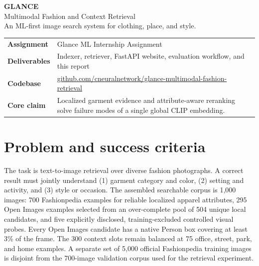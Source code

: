 \documentclass[11pt]{article}
\begin{document}
\thispagestyle{empty}
\colorbox{ink}{\parbox{0.96\linewidth}{\vspace{0.45in}\color{paper}\Huge\textbf{GLANCE}\\[0.12in]\LARGE Multimodal Fashion and Context Retrieval\\[0.18in]\normalsize An ML-first image search system for clothing, place, and style.\vspace{0.45in}}}

\vspace{0.42in}
\begin{tabularx}{\linewidth}{@{}>{\bfseries}l X@{}}
Assignment & Glance ML Internship Assignment \\
Deliverables & Indexer, retriever, FastAPI website, evaluation workflow, and this report \\
Codebase & \href{https://github.com/cneuralnetwork/glance-multimodal-fashion-retrieval}{github.com/cneuralnetwork/glance-multimodal-fashion-retrieval} \\
Core claim & Localized garment evidence and attribute-aware reranking solve failure modes of a single global CLIP embedding. \\
\end{tabularx}

\vfill
{}
\vspace{0.2in}
\newpage

\section{Problem and success criteria}

The task is text-to-image retrieval over diverse fashion photographs. A correct result must jointly understand (1) garment category and color, (2) setting and activity, and (3) style or occasion. The assembled searchable corpus is 1,000 images: 700 Fashionpedia examples for reliable localized apparel attributes, 295 Open Images examples selected from an over-complete pool of 504 unique local candidates, and five explicitly disclosed, training-excluded controlled visual probes. Every Open Images candidate has a native Person box covering at least 3\% of the frame. The 300 context slots remain balanced at 75 office, street, park, and home examples. A separate set of 5,000 official Fashionpedia training images is disjoint from the 700-image validation corpus used for the retrieval experiment.
\end{document}

